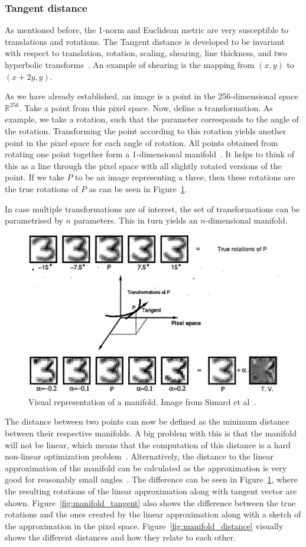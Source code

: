 \subsubsection{Tangent distance}
As mentioned before, the 1-norm and Euclidean metric are very susceptible to translations and rotations.
The Tangent distance is developed to be invariant with respect to translation, rotation, scaling, shearing, line thickness, and two hyperbolic transforms~\cite{LiweiWang2005}. An example of shearing is the mapping from \((x, y)\) to \((x+2y, y)\).

As we have already established, an image is a point in the 256-dimensional space \(\mathbb{R}^{256}\).
Take a point from this pixel space.
Now, define a transformation.
As example, we take a rotation, such that the parameter corresponds to the angle of the rotation.
Transforming the point according to this rotation yields another point in the pixel space for each angle of rotation.
All points obtained from rotating one point together form a 1-dimensional manifold~\cite{Simard1992, Simard2000}.
It helps to think of this as a line through the pixel space with all slightly rotated versions of the point.
If we take \(P\) to be an image representing a three, then these rotations are the true rotations of \(P\) as can be seen in Figure~\ref{fig:manifold_showcase}.

In case multiple transformations are of interest, the set of transformations can be parametrised by \(n\) parameters. This in turn yields an \(n\)-dimensional manifold.
\begin{figure}[H]
    \centering
    \includegraphics[width = .5\textwidth]{images/knn/manifold_showcase.png}
    \caption{Visual representation of a manifold. Image from Simard et al~\cite{Simard1992}.}\label{fig:manifold_showcase} %
\end{figure}

The distance between two points can now be defined as the minimum distance between their respective manifolds.
A big problem with this is that the manifold will not be linear, which means that the computation of this distance is a hard non-linear optimization problem~\cite{Keysers2002}.
Alternatively, the distance to the linear approximation of the manifold can be calculated as the approximation is very good for reasonably small angles~\cite{Simard2000}.
The difference can be seen in Figure~\ref{fig:manifold_showcase}, where the resulting rotations of the linear approximation along with tangent vector are shown.
Figure~\ref{fig:manifold_tangent} also shows the difference between the true rotations and the ones created by the linear approximation along with a sketch of the approximation in the pixel space.
Figure~\ref{fig:manifold_distance} visually shows the different distances and how they relate to each other.

